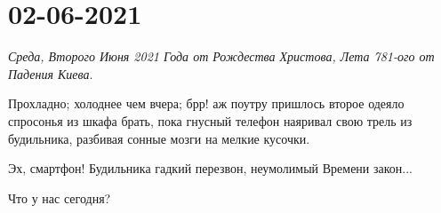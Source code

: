  
 
 
 
 
\section{02-06-2021}
\label{sec:kiev.pogoda.02_06_2021}

\emph{Среда, Второго Июня 2021 Года от Рождества Христова, Лета 781-ого от Падения Киева}.

Прохладно; холоднее чем вчера; брр! аж поутру пришлось второе одеяло спросонья
из шкафа брать, пока гнусный телефон наяривал свою трель из будильника,
разбивая сонные мозги на мелкие кусочки.

Эх, смартфон! Будильника гадкий перезвон, неумолимый Времени закон...

Что у нас сегодня?

